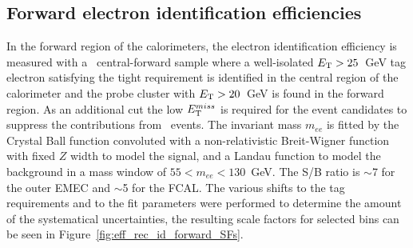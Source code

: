\begin{figure}
\end{figure}

\subsection{Forward electron identification efficiencies}

In the forward region of the calorimeters, the electron identification efficiency is measured with a \Zee\ central-forward sample  where  a  well-isolated $E_{\mathrm{T}} > 25$~GeV tag  electron satisfying the tight requirement is identified in the central region of the calorimeter and the probe cluster with $E_{\mathrm{T}} > 20$~GeV is found in the forward region. As an additional cut the low $E_{\mathrm{T}}^{miss}$ is required for the event candidates to suppress the contributions from \Wenu\ events.
The invariant mass $m_{ee}$ is fitted by the Crystal Ball function convoluted with a non-relativistic Breit-Wigner function with fixed $Z$ width to model the signal, and a Landau function to model the background in a mass window of $55 < m_{ee} < 130$~GeV. The S/B ratio is $\sim$7 for the outer EMEC and $\sim$5 for the FCAL. The various shifts to the tag requirements and to the fit parameters were performed to determine the amount of the systematical uncertainties, the resulting scale factors for selected bins can be seen in Figure~\ref{fig:eff_rec_id_forward_SFs}.

